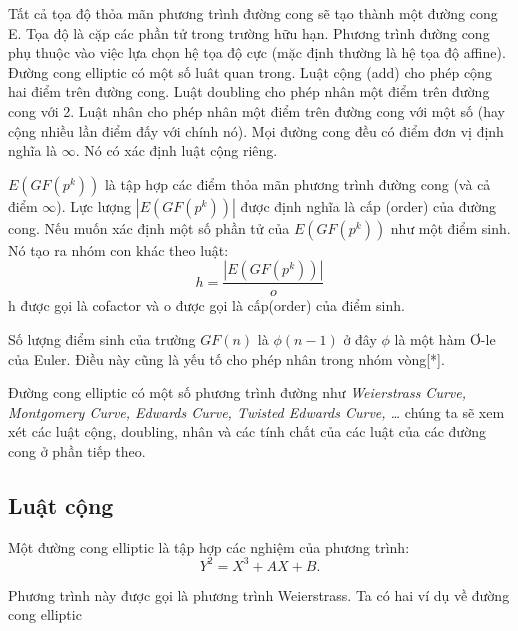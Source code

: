 \documentclass[a4paper,12pt]{report}
\begin{document}
Tất cả tọa độ thỏa mãn phương trình đường cong sẽ tạo thành một đường cong E. Tọa độ là cặp các phần tử trong trường hữu hạn. Phương trình đường cong phụ thuộc vào việc lựa chọn hệ tọa độ cực (mặc định thường là hệ tọa độ affine). Đường cong elliptic có một số luât quan trong. Luật cộng (add) cho phép cộng hai điểm trên đường cong. Luật doubling cho phép nhân một điểm trên đường cong với 2. Luật nhân cho phép nhân một điểm trên đường cong với một số (hay cộng nhiều lần điểm đấy với chính nó). Mọi đường cong đều có điểm đơn vị định nghĩa là $\infty$. Nó có xác định luật cộng riêng.

$E(GF(p^k))$ là tập hợp các điểm thỏa mãn phương trình đường cong (và cả điểm $\infty$). Lực lượng $|E(GF(p^k))|$ được định nghĩa là cấp (order) của đường cong. Nếu muốn xác định một số phần tử của 
$E(GF(p^k))$ như một điểm sinh. Nó tạo ra nhóm con khác theo luật:
\begin{displaymath}
h = \frac{|E(GF(p^k))|}{o}
\end{displaymath}
h được gọi là cofactor và o được gọi là cấp(order) của điểm sinh.

Số lượng điểm sinh của trường $GF(n)$ là $\phi (n - 1)$ ở đây $\phi$ là một hàm Ơ-le của Euler. Điều này cũng là yếu tố cho phép nhân trong nhóm vòng[*].

Đường cong elliptic có một số phương trình đường như \textit{Weierstrass Curve, Montgomery Curve, Edwards Curve, Twisted Edwards Curve, \ldots } chúng ta sẽ xem xét các luật cộng, doubling, nhân và các tính chất của các luật của các đường cong ở phần tiếp theo.
\subsection*{Luật cộng}
Một đường cong elliptic là tập hợp các nghiệm của phương trình:
\begin{displaymath}
Y^2 = X^3 + AX + B.
\end{displaymath}

Phương trình này được gọi là phương trình Weierstrass. Ta có hai ví dụ về đường cong elliptic
\end{document}
